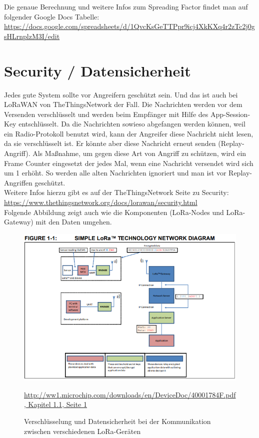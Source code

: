 Die genaue Berechnung und weitere Infos zum Spreading Factor findet man auf folgender Google Docs Tabelle: \url{https://docs.google.com/spreadsheets/d/1QvcKsGeTTPpr9icj4XkKXq4r2zTc2j0gsHLrnplzM3I/edit}

\section{Security / Datensicherheit}
Jedes gute System sollte vor Angreifern geschützt sein. Und das ist auch bei LoRaWAN von TheThingsNetwork der Fall. Die Nachrichten werden vor dem Versenden verschlüsselt und werden beim Empfänger mit Hilfe des App-Session-Key entschlüsselt. Da die Nachrichten sowieso abgefangen werden können, weil ein Radio-Protokoll benutzt wird, kann der Angreifer diese Nachricht nicht lesen, da sie verschlüsselt ist. Er könnte aber diese Nachricht erneut senden (Replay-Angriff). Als Maßnahme, um gegen diese Art von Angriff zu schützen, wird ein Frame Counter eingesetzt der jedes Mal, wenn eine Nachricht versendet wird sich um 1 erhöht. So werden alle alten Nachrichten ignoriert und man ist vor Replay-Angriffen geschützt.\\

Weitere Infos hierzu gibt es auf der TheThingsNetwork Seite zu Security: \url{https://www.thethingsnetwork.org/docs/lorawan/security.html}\\

Folgende Abbildung zeigt auch wie die Komponenten (LoRa-Nodes und LoRa-Gateway) mit den Daten umgehen.
\begin{figure}[H]
    \center
    \includegraphics[width=15cm]{Bilder/lora-11.png}\\
    \caption{Verschlüsselung und Datensicherheit bei der Kommunikation zwischen verschiedenen LoRa-Geräten}
    \begin{center} \quelle\url{http://ww1.microchip.com/downloads/en/DeviceDoc/40001784F.pdf, Kapitel 1.1, Seite 1} \end{center}
        \label{fig:security}
\end{figure}
